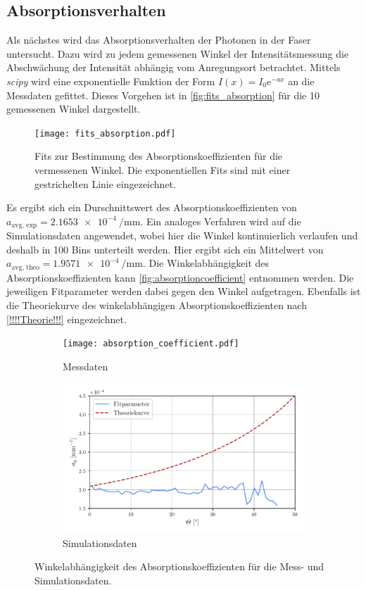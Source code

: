 \subsection{Absorptionsverhalten}
Als nächstes wird das Absorptionsverhalten der Photonen in der Faser untersucht.  
Dazu wird zu jedem gemessenen Winkel der Intensitätsmessung die Abschwächung der Intensität abhängig vom Anregungsort betrachtet. Mittels \textit{scipy} \cite{scipy}
wird eine exponentielle Funktion der Form $I(x) = I_0 \mathrm{e}^{-ax}$ an die Messdaten gefittet. Dieses Vorgehen ist in \autoref{fig:fits_absorption} für die 10 gemessenen Winkel 
dargestellt.
\begin{figure}
  \centering
  \texttt{[image: fits\_absorption.pdf]}
  \caption{Fits zur Bestimmung des Absorptionskoeffizienten für die vermessenen Winkel. Die exponentiellen Fits sind mit einer gestrichelten Linie eingezeichnet.}
  \label{fig:fits_absorption}
\end{figure}
Es ergibt sich ein Durschnittswert des Absorptionskoeffizienten von $a_\text{avg, exp} = \qty{2.1653e-4}{\per\milli\metre}$.
Ein analoges Verfahren wird auf die Simulationsdaten angewendet, wobei hier die Winkel kontinuierlich verlaufen und deshalb in 100 Bins unterteilt werden. 
Hier ergibt sich ein Mittelwert von  $a_\text{avg, theo} = \qty{1.9571e-4}{\per\milli\metre}$.
Die Winkelabhängigkeit des Absorptionskoeffizienten kann \autoref{fig:absorptioncoefficient} entnommen werden. Die jeweiligen Fitparameter werden dabei gegen den Winkel aufgetragen.
Ebenfalls ist die Theoriekurve des winkelabhängigen Absorptionskoeffizienten nach \autoref{!!!!Theorie!!!} eingezeichnet.
\begin{figure}
  \centering
  \begin{subfigure}{.7\textwidth}
    \texttt{[image: absorption\_coefficient.pdf]}
    \caption{Messdaten}
    \label{fig:absorptioncoefficient_data}
  \end{subfigure}
  \hfill
  \begin{subfigure}{.7\textwidth}
    \includegraphics[width = \textwidth]{content/pics/absorption_sim2.pdf}
    \caption{Simulationsdaten}
    \label{fig:absorptioncoefficient_sim}
  \end{subfigure}
  \caption{Winkelabhängigkeit des Absorptionskoeffizienten für die Mess- und Simulationsdaten.}
  \label{fig:absorptioncoefficient}
\end{figure}

